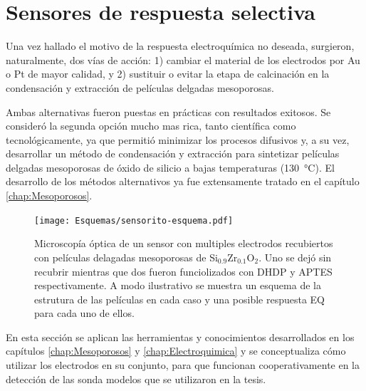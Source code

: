 {\section{Sensores de respuesta selectiva}

	Una vez hallado el motivo de la respuesta electroquímica no deseada, surgieron, naturalmente, dos vías de acción: 1) cambiar el material de los electrodos por Au o Pt de mayor calidad, y 2) sustituir o evitar la etapa de calcinación en la condensación y extracción de películas delgadas mesoporosas.

	Ambas alternativas fueron puestas en prácticas con resultados exitosos. Se consideró la segunda opción mucho mas rica, tanto científica como tecnológicamente, ya que permitió minimizar los procesos difusivos y, a su vez, desarrollar un método de condensación y extracción para sintetizar películas delgadas mesoporosas de óxido de silicio a bajas temperaturas (\SI{130}{\celsius}). El desarrollo de los métodos alternativos ya fue extensamente tratado en el capítulo \ref{chap:Mesoporosos}.

			\begin{figure}[ht!]
		 	       	\begin{center}
		 	       	\texttt{[image: Esquemas/sensorito-esquema.pdf]}
		        	\caption[Esquema de sensores EQ selectivos]{Microscopía óptica de un sensor con multiples electrodos recubiertos con películas delagadas mesoporosas de Si$_{0.9}$Zr$_{0.1}$O$_2$. Uno se dejó sin recubrir mientras que dos fueron funciolizados con DHDP y APTES respectivamente. A modo ilustrativo se muestra un esquema de la estrutura de las películas en cada caso y una posible respuesta EQ para cada uno de ellos.}
		         	\label{fig:sensor-calesita}
		         	\end{center}
		     		\end{figure}

    \pagebreak En esta sección se aplican las herramientas y conocimientos desarrollados en los capítulos \ref{chap:Mesoporosos} y \ref{chap:Electroquimica} y se conceptualiza cómo utilizar los electrodos en su conjunto, para que funcionan cooperativamente en la detección de las sonda modelos que se utilizaron en la tesis. 

}
